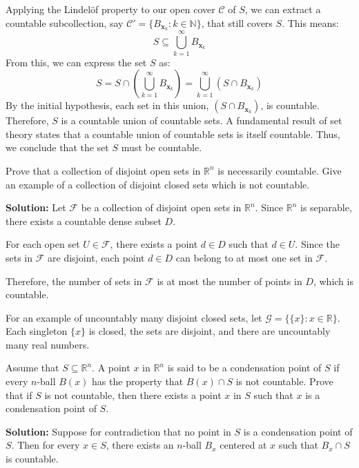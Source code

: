 Applying the Lindelöf property to our open cover $\mathcal{C}$ of $S$, we can extract a countable subcollection, say $\mathcal{C}' = \{B_{\mathbf{x}_k} : k \in \mathbb{N}\}$, that still covers $S$. This means:
$$S \subseteq \bigcup_{k=1}^{\infty} B_{\mathbf{x}_k}$$
From this, we can express the set $S$ as:
$$S = S \cap \left( \bigcup_{k=1}^{\infty} B_{\mathbf{x}_k} \right) = \bigcup_{k=1}^{\infty} (S \cap B_{\mathbf{x}_k})$$
By the initial hypothesis, each set in this union, $(S \cap B_{\mathbf{x}_k})$, is countable.
Therefore, $S$ is a countable union of countable sets. A fundamental result of set theory states that a countable union of countable sets is itself countable. Thus, we conclude that the set $S$ must be countable.


\begin{problembox}
Prove that a collection of disjoint open sets in \( \mathbb{R}^n \) is necessarily countable. Give an example of a collection of disjoint closed sets which is not countable.
\end{problembox}

\textbf{Solution:} Let $\mathcal{F}$ be a collection of disjoint open sets in $\mathbb{R}^n$. Since $\mathbb{R}^n$ is separable, there exists a countable dense subset $D$.

For each open set $U \in \mathcal{F}$, there exists a point $d \in D$ such that $d \in U$. Since the sets in $\mathcal{F}$ are disjoint, each point $d \in D$ can belong to at most one set in $\mathcal{F}$.

Therefore, the number of sets in $\mathcal{F}$ is at most the number of points in $D$, which is countable.

For an example of uncountably many disjoint closed sets, let $\mathcal{G} = \{\{x\} : x \in \mathbb{R}\}$. Each singleton $\{x\}$ is closed, the sets are disjoint, and there are uncountably many real numbers.

\begin{problembox}
Assume that \( S \subseteq \mathbb{R}^n \). A point \( x \) in \( \mathbb{R}^n \) is said to be a condensation point of \( S \) if every \( n \)-ball \( B(x) \) has the property that \( B(x) \cap S \) is not countable. Prove that if \( S \) is not countable, then there exists a point \( x \) in \( S \) such that \( x \) is a condensation point of \( S \).
\end{problembox}

\textbf{Solution:} Suppose for contradiction that no point in $S$ is a condensation point of $S$. Then for every $x \in S$, there exists an $n$-ball $B_x$ centered at $x$ such that $B_x \cap S$ is countable.

